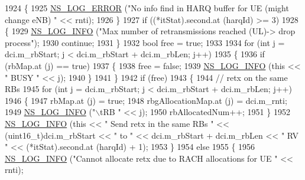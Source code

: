 \begin{DoxyCode}
1924                 \{
1925                   \hyperlink{group__logging_ga0261a8db1d4ac5f79417d117634fd455}{NS\_LOG\_ERROR} (\textcolor{stringliteral}{"No info find in HARQ buffer for UE (might change eNB) "} << 
      rnti);
1926                 \}
1927               \textcolor{keywordflow}{if} ((*itStat).second.at (harqId) >= 3)
1928                 \{
1929                   \hyperlink{group__logging_gafbd73ee2cf9f26b319f49086d8e860fb}{NS\_LOG\_INFO} (\textcolor{stringliteral}{"Max number of retransmissions reached (UL)-> drop process"});
1930                   \textcolor{keywordflow}{continue};
1931                 \}
1932               \textcolor{keywordtype}{bool} free = \textcolor{keyword}{true};
1933 
1934               \textcolor{keywordflow}{for} (\textcolor{keywordtype}{int} j = dci.m\_rbStart; j < dci.m\_rbStart + dci.m\_rbLen; j++)
1935                 \{
1936                   \textcolor{keywordflow}{if} (rbMap.at (j) == \textcolor{keyword}{true})
1937                     \{
1938                       free = \textcolor{keyword}{false};
1939                       \hyperlink{group__logging_gafbd73ee2cf9f26b319f49086d8e860fb}{NS\_LOG\_INFO} (\textcolor{keyword}{this} << \textcolor{stringliteral}{" BUSY "} << j);
1940                     \}
1941                 \}
1942               \textcolor{keywordflow}{if} (free)
1943                 \{
1944                   \textcolor{comment}{// retx on the same RBs}
1945                   \textcolor{keywordflow}{for} (\textcolor{keywordtype}{int} j = dci.m\_rbStart; j < dci.m\_rbStart + dci.m\_rbLen; j++)
1946                     \{
1947                       rbMap.at (j) = \textcolor{keyword}{true};
1948                       rbgAllocationMap.at (j) = dci.m\_rnti;
1949                       \hyperlink{group__logging_gafbd73ee2cf9f26b319f49086d8e860fb}{NS\_LOG\_INFO} (\textcolor{stringliteral}{"\(\backslash\)tRB "} << j);
1950                       rbAllocatedNum++;
1951                     \}
1952                   \hyperlink{group__logging_gafbd73ee2cf9f26b319f49086d8e860fb}{NS\_LOG\_INFO} (\textcolor{keyword}{this} << \textcolor{stringliteral}{" Send retx in the same RBs "} << (uint16\_t)dci.m\_rbStart 
      << \textcolor{stringliteral}{" to "} << dci.m\_rbStart + dci.m\_rbLen << \textcolor{stringliteral}{" RV "} << (*itStat).second.at (harqId) + 1);
1953                 \}
1954               \textcolor{keywordflow}{else}
1955                 \{
1956                   \hyperlink{group__logging_gafbd73ee2cf9f26b319f49086d8e860fb}{NS\_LOG\_INFO} (\textcolor{stringliteral}{"Cannot allocate retx due to RACH allocations for UE "} << rnti);

\end{DoxyCode}
